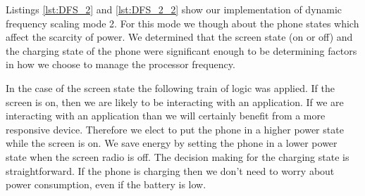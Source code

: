 \documentclass{article} %
\begin{document}
Listings \ref{lst:DFS_2} and \ref{lst:DFS_2_2} show our implementation of dynamic frequency scaling mode 2. For this mode we though about the phone states which affect the scarcity of power. We determined that the screen state (on or off) and the charging state of the phone were significant enough to be determining factors in how we choose to manage the processor frequency.

In the case of the screen state the following train of logic was applied. If the screen is on, then we are likely to be interacting with an application. If we are interacting with an application than we will certainly benefit from a more responsive device. Therefore we elect to put the phone in a higher power state while the screen is on. We save energy by setting the phone in a lower power state when the screen radio is off.
The decision making for the charging state is straightforward. If the phone is charging then we don't need to worry about power consumption, even if the battery is low.
\end{document}
